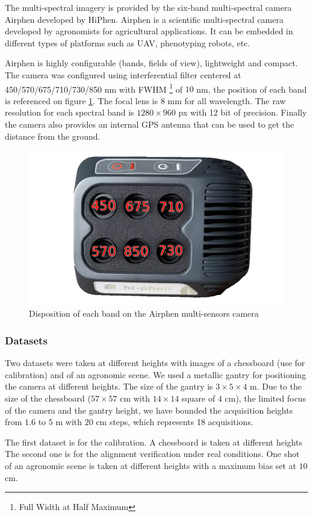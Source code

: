 \documentclass[a4paper,twoside]{article}
\begin{document}
	The multi-spectral imagery is provided by the six-band multi-spectral camera Airphen developed by HiPhen.
	Airphen is a scientific multi-spectral camera developed by agronomists for agricultural applications.
	It can be embedded in different types of platforms such as UAV, phenotyping robots, etc.
	\\
	\par Airphen is highly configurable (bands, fields of view), lightweight and compact.
	The camera was configured using interferential filter centered at 450/570/675/710/730/850 nm
	with FWHM \footnote{Full Width at Half Maximum} of $10$ nm, the position of each band is referenced on figure \ref{fig:bands-disposition}.
	The focal lens is 8 mm for all wavelength. The raw resolution for each spectral band is $1280 \times 960$ px with 12 bit of precision.
	Finally the camera also provides an internal GPS antenna that can be used to get the distance from the ground.
	
	\begin{figure}[h]
		\centering
		\includegraphics[width=0.6\linewidth]{../figures/airphen-detail4}
		\caption{Disposition of each band on the Airphen multi-sensors camera}
		\label{fig:bands-disposition}
	\end{figure}
	
	\subsubsection{Datasets}
	\par Two datasets were taken at different heights with images of a chessboard (use for calibration) and of an agronomic scene.
	We used a metallic gantry for positioning the camera at different heights.
	The size of the gantry is $3\times5\times4$ m.
	Due to the size of the chessboard ($57\times57$ cm with $14\times14$ square of $4$ cm), the limited focus of the camera and the gantry height,
	we have bounded the acquisition heights from $1.6$ to $5$ m with $20$ cm steps, which represents 18 acquisitions.
	\\
	\par The first dataset is for the calibration. A chessboard is taken at different heights %
	The second one is for the alignment verification under real conditions.
	One shot of an agronomic scene is taken at different heights %
	with a maximum bias set at $10$ cm. %
	
\end{document}

